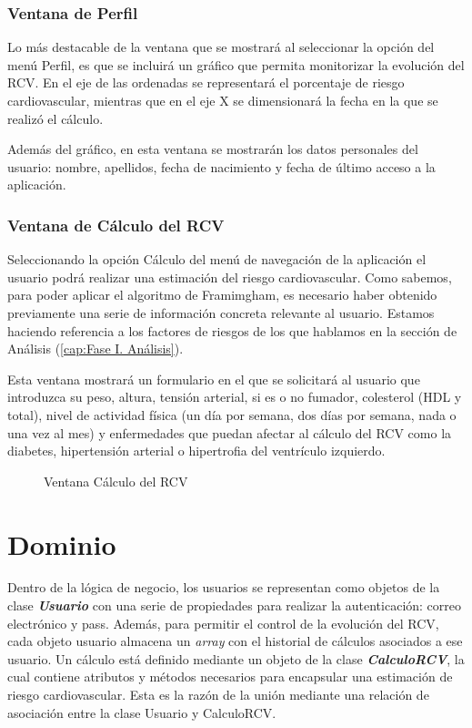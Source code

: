 \subsubsection{Ventana de Perfil}
Lo más destacable de la ventana que se mostrará al seleccionar la opción del menú Perfil, es que se incluirá un gráfico que permita monitorizar la evolución del RCV. En el eje de las ordenadas se representará el porcentaje de riesgo cardiovascular, mientras que en el eje X se dimensionará la fecha en la que se realizó el cálculo.

Además del gráfico, en esta ventana se mostrarán los datos personales del usuario: nombre, apellidos, fecha de nacimiento y fecha de último acceso a la aplicación. 

\subsubsection{Ventana de Cálculo del RCV}
Seleccionando la opción Cálculo del menú de navegación de la aplicación el usuario podrá realizar una estimación del riesgo cardiovascular. Como sabemos, para poder aplicar el algoritmo de Framimgham, es necesario haber obtenido previamente una serie de información concreta relevante al usuario. Estamos haciendo referencia a los factores de riesgos de los que hablamos en la sección de Análisis (\ref{cap:Fase I. Análisis}). 

Esta ventana mostrará un formulario en el que se solicitará al usuario que introduzca su peso, altura, tensión arterial, si es o no fumador, colesterol (HDL y total), nivel de actividad física (un día por semana, dos días por semana, nada o una vez al mes) y enfermedades que puedan afectar al cálculo del RCV como la diabetes, hipertensión arterial o hipertrofia del ventrículo izquierdo.

\begin{figure}[htb]
	\centering

	\caption{Ventana Cálculo del RCV}
	\label{fig:cirugiaRA}
\end{figure}


\section{Dominio}
Dentro de la lógica de negocio, los usuarios se representan como objetos de la clase \emph{\textbf{Usuario}} con una serie de propiedades para realizar la autenticación: correo electrónico y pass. Además, para permitir el control de la evolución del RCV, cada objeto usuario almacena un \emph{array} con el historial de cálculos asociados a ese usuario. Un cálculo está definido mediante un objeto de la clase \textbf{\emph{CalculoRCV}}, la cual contiene atributos y métodos necesarios para encapsular una estimación de riesgo cardiovascular. Esta es la razón de la unión mediante una relación de asociación entre la clase Usuario y CalculoRCV.

